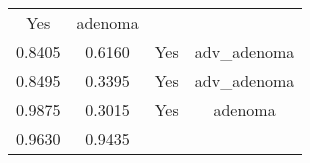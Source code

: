 \documentclass[12pt,]{article}
\begin{document}
\begin{longtable}[]{@{}cccc@{}}
\begin{minipage}[t]{0.22\columnwidth}
Yes\strut
\end{minipage} & \begin{minipage}[t]{0.16\columnwidth}\centering\strut
adenoma\strut
\end{minipage}\tabularnewline
\begin{minipage}[t]{0.24\columnwidth}\centering\strut
0.8405\strut
\end{minipage} & \begin{minipage}[t]{0.26\columnwidth}\centering\strut
0.6160\strut
\end{minipage} & \begin{minipage}[t]{0.22\columnwidth}\centering\strut
Yes\strut
\end{minipage} & \begin{minipage}[t]{0.16\columnwidth}\centering\strut
adv\_adenoma\strut
\end{minipage}\tabularnewline
\begin{minipage}[t]{0.24\columnwidth}\centering\strut
0.8495\strut
\end{minipage} & \begin{minipage}[t]{0.26\columnwidth}\centering\strut
0.3395\strut
\end{minipage} & \begin{minipage}[t]{0.22\columnwidth}\centering\strut
Yes\strut
\end{minipage} & \begin{minipage}[t]{0.16\columnwidth}\centering\strut
adv\_adenoma\strut
\end{minipage}\tabularnewline
\begin{minipage}[t]{0.24\columnwidth}\centering\strut
0.9875\strut
\end{minipage} & \begin{minipage}[t]{0.26\columnwidth}\centering\strut
0.3015\strut
\end{minipage} & \begin{minipage}[t]{0.22\columnwidth}\centering\strut
Yes\strut
\end{minipage} & \begin{minipage}[t]{0.16\columnwidth}\centering\strut
adenoma\strut
\end{minipage}\tabularnewline
\begin{minipage}[t]{0.24\columnwidth}\centering\strut
0.9630\strut
\end{minipage} & \begin{minipage}[t]{0.26\columnwidth}\centering\strut
0.9435\strut
\end{minipage} & \begin{minipage}[t]{0.22\columnwidth}\centering\strut

\end{minipage}
\end{longtable}
\end{document}
